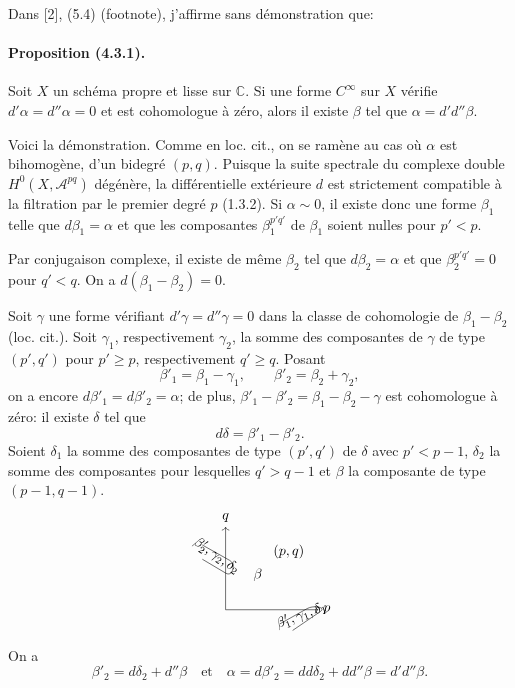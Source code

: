 \documentclass[10pt]{article}
\newcommand{\C}{\mathbb C}
\begin{document}
Dans [2], (5.4) (footnote), j'affirme sans démonstration que:

\paragraph{Proposition (4.3.1).} Soit $X$ un schéma propre et lisse sur $\C$. Si une forme $C^\infty$ sur $X$ vérifie $d'\alpha=d''\alpha=0$ et est cohomologue à zéro, alors il existe $\beta$ tel que $\alpha=d'd''\beta$.

Voici la démonstration. Comme en loc. cit., on se ramène au cas où $\alpha$ est bihomogène, d'un bidegré $(p,q)$. Puisque la suite spectrale du complexe double $H^0(X,\mathcal A^{pq})$ dégénère, la différentielle extérieure $d$ est strictement compatible à la filtration par le premier degré $p$ (1.3.2). Si $\alpha\sim0$, il existe donc une forme $\beta_1$ telle que $d\beta_1=\alpha$ et que les composantes $\beta_1^{p'q'}$ de $\beta_1$ soient nulles pour $p'<p$.

Par conjugaison complexe, il existe de même $\beta_2$ tel que $d\beta_2=\alpha$ et que $\beta_2^{p'q'}=0$ pour $q'<q$. On a $d(\beta_1-\beta_2)=0$.

Soit $\gamma$ une forme vérifiant $d'\gamma=d''\gamma=0$ dans la classe de cohomologie de $\beta_1-\beta_2$ (loc. cit.). Soit $\gamma_1$, respectivement $\gamma_2$, la somme des composantes de $\gamma$ de type $(p',q')$ pour $p'\ge p$, respectivement $q'\ge q$. Posant
\[
\beta'_1=\beta_1-\gamma_1,\qquad \beta'_2=\beta_2+\gamma_2,
\]
on a encore $d\beta'_1=d\beta'_2=\alpha$; de plus, $\beta'_1-\beta'_2=\beta_1-\beta_2-\gamma$ est cohomologue à zéro: il existe $\delta$ tel que
\[
d\delta=\beta'_1-\beta'_2.
\]
Soient $\delta_1$ la somme des composantes de type $(p',q')$ de $\delta$ avec $p'<p-1$, $\delta_2$ la somme des composantes pour lesquelles $q'>q-1$ et $\beta$ la composante de type $(p-1,q-1)$.
\[
\begin{tikzpicture}[scale=.65,baseline=(current bounding box.center)]
\draw[->] (0,0)--(3.6,0) node[right] {$p$};
\draw[->] (0,0)--(0,3.2) node[above] {$q$};
\node at (2.45,2.25) {$(p,q)$};
\node at (1.25,1.35) {$\beta$};
\draw[rounded corners] (-.9,2.5)--(.35,1.8)--(.2,1.3)--(-.9,1.95);
\node[rotate=-35] at (-.35,2.08) {$\beta'_2,\gamma_2,\delta_2$};
\draw[rounded corners] (2.1,-.55)--(3.35,.15)--(3.85,.05)--(2.6,-.8);
\node[rotate=20] at (2.95,-.22) {$\beta'_1,\gamma_1,\delta_1$};
\end{tikzpicture}
\]
On a
\[
\beta'_2=d\delta_2+d''\beta
\quad\text{et}\quad
\alpha=d\beta'_2=dd\delta_2+dd''\beta=d'd''\beta.
\]
\end{document}
